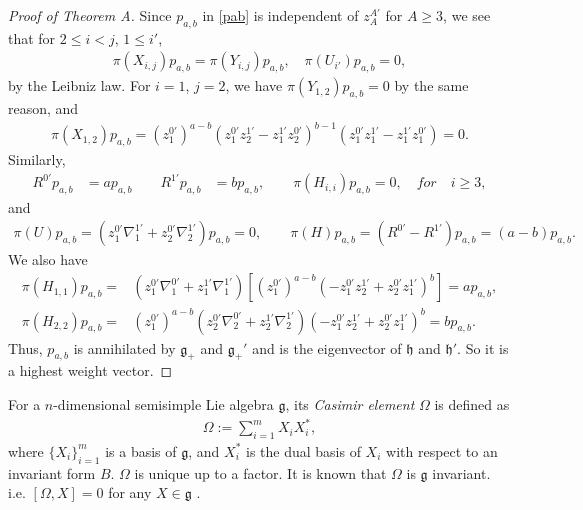 \documentclass[a4paper,11pt]{amsart}
\numberwithin{equation}{section}
\begin{document}
\begin{proof}[Proof of Theorem A]
  Since $p_{a,b}$ in \eqref{pab} is independent of $z_A^{A'}$ for $A\geq 3$, we see that for $2\leq i<j$, $1\leq i'$,
\begin{equation}\begin{aligned}\label{pi pab}
\pi(X_{i,j})p_{a,b}=\pi(Y_{i,j})p_{a,b},\quad\pi(U_{i'})p_{a,b}=0,
\end{aligned}\end{equation}
by the Leibniz law. For $i=1$, $j=2$, we have $\pi(Y_{1,2})p_{a,b}=0$ by the same reason, and
\begin{equation}\begin{aligned}\label{3.24}
\pi(X_{1,2})p_{a,b}
=(z_1^{0'})^{a-b}(z_1^{0'}z_2^{1'}-z_1^{1'}z_2^{0'})^{b-1}(z_1^{0'}z_1^{1'}-z_1^{1'}z_1^{0'})=0.
\end{aligned}\end{equation}
Similarly,
\begin{equation}\begin{aligned}
R^{0'}p_{a,b}&=ap_{a,b}\qquad R^{1'}p_{a,b}&=bp_{a,b},\qquad\pi(H_{i,i})p_{a,b}=0,\quad for \quad i\geq 3,
\end{aligned}\end{equation}
and
\begin{equation}\begin{aligned}\label{piH}
\pi(U)p_{a,b}=(z_1^{0'}\nabla_1^{1'}+z_2^{0'}\nabla_2^{1'})p_{a,b}=0,\qquad\pi(H)p_{a,b}=(R^{0'}-R^{1'})p_{a,b}=(a-b)p_{a,b}.
\end{aligned}\end{equation}
We also have
\begin{equation}\begin{aligned}\label{pi H11H22}
\pi(H_{1,1})p_{a,b}=&(z_{1}^{0'} \nabla_{1}^{0'} + z_{1}^{1'} \nabla_{1}^{1'})\left[(z_1^{0'})^{a-b}(-z_1^{0'}z_2^{1'}+z_2^{0'}z_1^{1'})^{b}\right]=ap_{a,b},\\
\pi(H_{2,2})p_{a,b}=&(z_1^{0'})^{a-b}(z_2^{0'} \nabla_{2}^{0'}+z_2^{1'} \nabla_{2}^{1'})(-z_1^{0'}z_2^{1'}+z_2^{0'}z_1^{1'})^{b}=bp_{a,b}.
\end{aligned}\end{equation}
Thus, $p_{a,b}$ is annihilated by $\mathfrak{g}_{+}$ and $\mathfrak{g}_{+}'$ and is the eigenvector of $\mathfrak{h}$ and $\mathfrak{h}'$. So it is a highest weight vector.
\end{proof}



For a $n$-dimensional semisimple Lie algebra $\mathfrak{g}$, its \emph{Casimir element} $\Omega$ is defined as
\begin{equation}\begin{aligned}
\Omega:=\sum_{i=1}^m X_iX_i^*,
\end{aligned}\end{equation}
where $\{X_i\}^m_{i=1}$ is a basis of $\mathfrak{g}$, and $X_i^*$ is the dual basis of $X_i$ with respect to an invariant form $B$. $\Omega$ is unique up to a factor. It is known that $\Omega$ is $\mathfrak{g}$ invariant. i.e. $[\Omega,X]=0$ for any $X\in \mathfrak{g}$ \cite[Section 6.2]{humphrey}.
\end{document}
